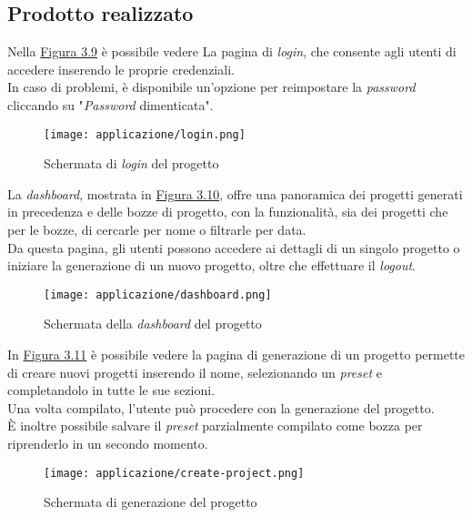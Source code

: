 \subsection{Prodotto realizzato}
\label{subsec:prodotto-realizzato}

Nella {\hyperref[fig:login]{Figura 3.9}} è possibile vedere La pagina di \textit{login}, che consente agli utenti di accedere inserendo le proprie credenziali.\\
In caso di problemi, è disponibile un'opzione per reimpostare la \textit{password} cliccando su "\textit{Password} dimenticata".
\begin{figure}[H]
    \centering
    \texttt{[image: applicazione/login.png]}
    \caption{Schermata di \textit{login} del progetto}
    \label{fig:login}
\end{figure}

\pagebreak
\noindent La \textit{dashboard}, mostrata in {\hyperref[fig:dashboard]{Figura 3.10}}, offre una panoramica dei progetti generati in precedenza e delle bozze di progetto, con la funzionalità, sia dei progetti che per le bozze,
di cercarle per nome o filtrarle per data. \\
Da questa pagina, gli utenti possono accedere ai dettagli di un singolo progetto o iniziare la generazione di un nuovo progetto, oltre che effettuare il \textit{logout}.\\
\begin{figure}[H]
    \centering
    \texttt{[image: applicazione/dashboard.png]}
    \caption{Schermata della \textit{dashboard} del progetto}
    \label{fig:dashboard}
\end{figure}

\pagebreak
\noindent In {\hyperref[fig:create-project]{Figura 3.11}} è possibile vedere la pagina di generazione di un progetto permette di creare nuovi progetti inserendo il nome, selezionando un \textit{preset} e completandolo in tutte le sue sezioni.\\
Una volta compilato, l’utente può procedere con la generazione del progetto. \\
È inoltre possibile salvare il \textit{preset} parzialmente compilato come bozza per riprenderlo in un secondo momento.
\begin{figure}[H]
    \centering
    \texttt{[image: applicazione/create-project.png]}
    \caption{Schermata di generazione del progetto}
    \label{fig:create-project}
\end{figure}


